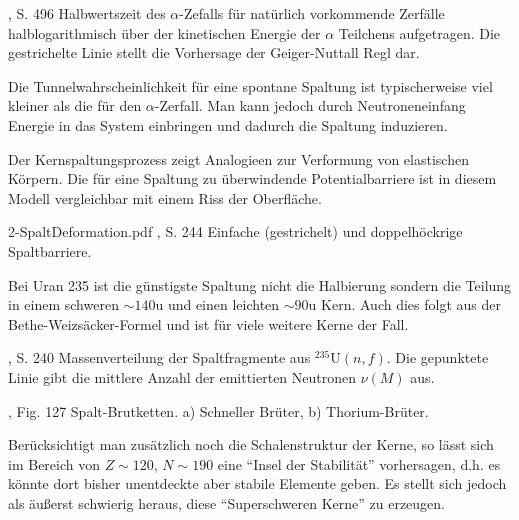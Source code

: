 \begin{enumerate}[label=\arabic{*})]
	{\TiplerMPFife, S. 496}
	{Halbwertszeit des $\alpha$-Zefalls
	für natürlich vorkommende Zerfälle halblogarithmisch über der kinetischen
	Energie der $\alpha$ Teilchens aufgetragen. Die gestrichelte Linie stellt die
	Vorhersage der Geiger-Nuttall Regl dar.}


Die Tunnelwahrscheinlichkeit für eine spontane Spaltung ist typischerweise
viel kleiner als die für den $\alpha$-Zerfall. Man kann jedoch durch 
Neutroneneinfang Energie in das System einbringen und dadurch die Spaltung
induzieren.

Der Kernspaltungsprozess zeigt Analogieen zur Verformung von elastischen
Körpern. Die für eine Spaltung zu überwindende Potentialbarriere ist in diesem
Modell vergleichbar mit einem Riss der Oberfläche.

\sfigure%
	{2-SpaltDeformation.pdf}
	{\BethgeWalter, S. 244}
	{Einfache (gestrichelt) und doppelhöckrige Spaltbarriere.}
% 

\begin{bspn}
Bei Uran 235 ist die günstigste Spaltung nicht die Halbierung sondern die
Teilung in einem schweren $\sim 140\mathrm{u}$ und einen leichten $\sim
90\mathrm{u}$ Kern. Auch dies folgt aus der Bethe-Weizsäcker-Formel und ist für
viele weitere Kerne der Fall.\bsphere
\end{bspn}

% 	


	{\BethgeWalter, S. 240}
	{Massenverteilung der Spaltfragmente aus ${}^{235}\mathrm{U}(n,f)$. Die
	gepunktete Linie gibt die mittlere Anzahl der emittierten Neutronen $\nu(M)$
	aus.}
	

	{\KuckukKern, Fig. 127}
	{Spalt-Brutketten. a) Schneller Brüter, b) Thorium-Brüter.}


\begin{bspn}
Berücksichtigt man zusätzlich noch die Schalenstruktur der Kerne, so lässt sich im Bereich
von $Z\sim 120$, $N\sim 190$ eine ``Insel der Stabilität'' vorhersagen, d.h. es
könnte dort bisher unentdeckte aber stabile Elemente geben. Es stellt sich jedoch als
äußerst schwierig heraus, diese
``Superschweren Kerne'' zu erzeugen.\bsphere
\end{bspn}



\end{enumerate}
